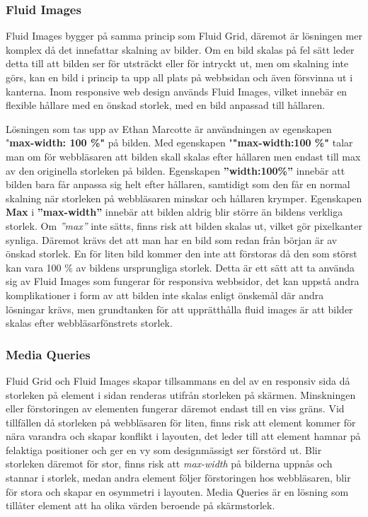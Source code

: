 \documentclass[11pt]{article}
\begin{document}
\subsubsection{Fluid Images}
Fluid Images bygger på samma princip som Fluid Grid, däremot är lösningen mer komplex då det innefattar skalning av bilder. Om en bild skalas på fel sätt leder detta till att bilden ser för utsträckt eller för intryckt ut, men om skalning inte görs, kan en bild i princip ta upp all plats på webbsidan och även försvinna ut i kanterna. Inom responsive web design används Fluid Images, vilket innebär en flexible hållare med en önskad storlek, med en bild anpassad till hållaren.  

Lösningen som tas upp av Ethan Marcotte är användningen av egenskapen "\textbf{max-width: 100 \%"} på bilden. Med egenskapen "\textbf{"max-width:100 \%"}  talar man om för webbläsaren att bilden skall skalas efter hållaren men endast till max av den originella storleken på bilden. Egenskapen \textbf{”width:100\%”} innebär att bilden bara får anpassa sig helt efter hållaren, samtidigt som den får en normal skalning när storleken på webbläsaren minskar och hållaren krymper. Egenskapen \textbf{Max} i \textbf{”max-width”} innebär att bilden aldrig blir större än bildens verkliga storlek. Om \textit{”max”} inte sätts, finns risk att bilden skalas ut, vilket gör pixelkanter synliga. Däremot krävs det att man har en bild som redan från början är av önskad storlek. En för liten bild kommer den inte att förstoras då den som störst kan vara 100 \% av bildens ursprungliga storlek. Detta är ett sätt att ta använda sig av Fluid Images som fungerar för responsiva webbsidor, det kan uppstå andra komplikationer i form av att bilden inte skalas enligt önskemål där andra lösningar krävs, men grundtanken för att upprätthålla fluid images är att bilder skalas efter webbläsarfönstrets storlek.

\subsubsection{Media Queries}
Fluid Grid och Fluid Images skapar tillsammans en del av en responsiv sida då storleken på element i sidan renderas utifrån storleken på skärmen. Minskningen eller förstoringen av elementen fungerar däremot endast till en viss gräns. Vid tillfällen då storleken på webbläsaren för liten, finns risk att element kommer för nära varandra och skapar konflikt i layouten, det leder till att element hamnar på felaktiga positioner och ger en vy som designmässigt ser förstörd ut. Blir storleken däremot för stor, finns risk att \textit{max-width} på bilderna uppnås och stannar i storlek, medan andra element följer förstoringen hos webbläsaren, blir för stora och skapar en osymmetri i layouten. Media Queries är en lösning som tillåter element att ha olika värden beroende på skärmstorlek.
\end{document}
